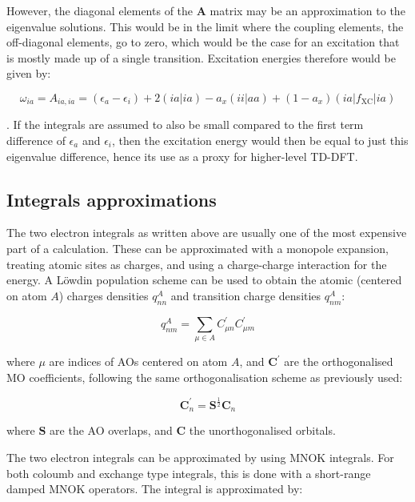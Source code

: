 However, the diagonal elements of the $\mathbf{A}$ matrix may be an approximation
to the eigenvalue solutions. This would be in the limit where the coupling elements,
the off-diagonal elements, go to zero, which would be the case for an excitation that
is mostly made up of a single transition. Excitation energies therefore would
be given by:

\begin{equation}
\omega_{ia} = A_{ia, ia} = \left( \epsilon_a - \epsilon_i \right) + 2\left(ia|ia\right) - a_x\left(ii|aa\right) + (1- a_x)\left(ia|f_{\text{XC}}|ia\right) 
\label{eq:diag_dom}
\end{equation}

. If the integrals are assumed to also be small compared to the first term difference 
of $\epsilon_a$ and $\epsilon_i$, then the excitation energy would then be equal
to just this eigenvalue difference, hence its use as a proxy for higher-level
TD-DFT.

\subsection{Integrals approximations}
\label{subsec:MNOK}

The two electron integrals as written above are usually one of the most expensive
part of a calculation. These can be approximated with a monopole expansion, treating
atomic sites as charges, and using a charge-charge interaction for the energy.
A L{\"o}wdin population scheme can be used to obtain the atomic (centered on atom
$A$) charges densities $q^A_{nn}$ and transition charge densities $q^A_{nm}$:

\begin{equation}
q^A_{nm} = \sum_{\mu \in A} C^\prime_{\mu n} C^\prime_{\mu m}
\end{equation}

where $\mu$ are indices of AOs centered on atom $A$, and $\mathbf{C}^\prime$ are the 
orthogonalised MO coefficients, following the same orthogonalisation scheme as 
previously used:

\begin{equation}
\mathbf{C}^\prime_n = \mathbf{S}^{\frac{1}{2}} \mathbf{C}_n
\end{equation}

where $\mathbf{S}$ are the AO overlaps, and $\mathbf{C}$ the unorthogonalised orbitals.

The two electron integrals can be approximated by using MNOK integrals. For both 
coloumb and exchange type integrals, this is done with a short-range damped MNOK
operators. The integral is approximated by:

